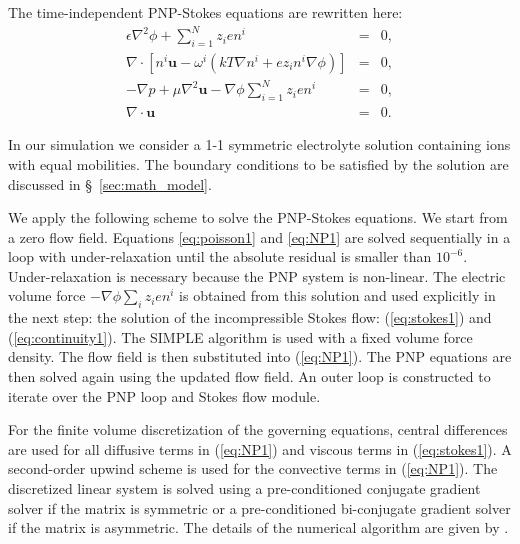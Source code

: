 The time-independent PNP-Stokes equations are rewritten here:
\begin{eqnarray}
\epsilon \nabla^2 \phi + \sum_{i=1}^{N} z_ien^i & = & 0,
\label{eq:poisson1}
\\
\nabla\cdot\left\lbrack n^i\mathbf{u} -\omega^i(kT\nabla
n^i + ez_in^i\nabla\phi) \right\rbrack&=&0 ,
\label{eq:NP1}
\\ 
-\nabla p + \mu \nabla^2 \mathbf{u} -  \nabla \phi \sum_{i=1}^{N} z_ien^i & = & 0, \label{eq:stokes1}\\
\nabla \cdot \mathbf{u} & = & 0. \label{eq:continuity1}
\end{eqnarray} 

In our simulation we consider a 1-1 symmetric electrolyte solution containing ions with equal mobilities. The boundary conditions to be satisfied by the solution are discussed in \S~\ref{sec:math_model}.

We apply the following scheme to solve the PNP-Stokes equations. We start from a zero flow field. Equations \ref{eq:poisson1} and \ref{eq:NP1} are solved sequentially in a loop with under-relaxation until the absolute residual is smaller than $10^{-6}$. Under-relaxation is necessary because the PNP system is non-linear. The electric volume force $- \nabla \phi\sum_i z_ien^i $ is obtained from this solution and used explicitly in the next step: the solution of the incompressible Stokes flow: (\ref{eq:stokes1}) and (\ref{eq:continuity1}). The SIMPLE algorithm is used with a fixed volume force density. The flow field is then substituted into (\ref{eq:NP1}). The PNP equations are then solved again using the updated flow field. An outer loop is constructed to iterate over the PNP loop and Stokes flow module.

For the finite volume discretization of the governing equations, central differences are used for all diffusive terms in (\ref{eq:NP1}) and viscous terms in (\ref{eq:stokes1}). A second-order upwind scheme is used for the convective terms in (\ref{eq:NP1}). The discretized linear system is solved using a pre-conditioned conjugate gradient solver if the matrix is symmetric or a pre-conditioned bi-conjugate gradient solver if the matrix is asymmetric. The details of the numerical algorithm are given by \cite{ferziger&peric}. 

